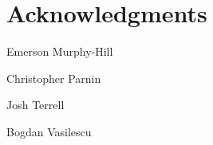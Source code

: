 \documentclass{sigplanconf}
\begin{document}
\section{Acknowledgments}
\begin{description}
  \item Emerson Murphy-Hill
  \item Christopher Parnin
  \item Josh Terrell
  \item Bogdan Vasilescu
\end{description}








\end{document}
